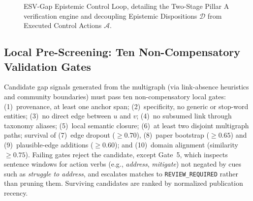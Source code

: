\documentclass[runningheads]{llncs}
\newcommand{\method}{ESV-Gap}
\begin{document}
\begin{figure}[t]
{%
}
\caption{\method{} Epistemic Control Loop, detailing the Two-Stage Pillar A verification engine and decoupling Epistemic Dispositions $\mathcal{D}$ from Executed Control Actions $\mathcal{A}$.}
\label{fig:arch}
\end{figure}

\subsection{Local Pre-Screening: Ten Non-Compensatory Validation Gates}
Candidate gap signals generated from the multigraph (via link-absence heuristics and community boundaries) must pass ten non-compensatory local gates: (1)~provenance, at least one anchor span; (2)~specificity, no generic or stop-word entities; (3)~no direct edge between $u$ and $v$; (4)~no subsumed link through taxonomy aliases; (5)~local semantic closure; (6)~at least two disjoint multigraph paths; survival of (7)~edge dropout ($\ge 0.70$), (8)~paper bootstrap ($\ge 0.65$) and (9)~plausible-edge additions ($\ge 0.60$); and (10)~domain alignment (similarity $\ge 0.75$). Failing gates reject the candidate, except Gate~5, which inspects sentence windows for action verbs (e.g., \emph{address}, \emph{mitigate}) not negated by cues such as \emph{struggle to address}, and escalates matches to \texttt{REVIEW\_\allowbreak REQUIRED} rather than pruning them. Surviving candidates are ranked by normalized publication recency.
\end{document}
